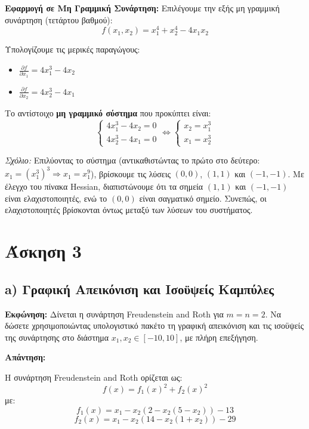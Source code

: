 \documentclass[a4paper,12pt]{article}
\begin{document}
\textbf{Εφαρμογή σε Μη Γραμμική Συνάρτηση:}
Επιλέγουμε την εξής μη γραμμική συνάρτηση (τετάρτου βαθμού):
\begin{equation}
    f(x_1, x_2) = x_1^4 + x_2^4 - 4x_1 x_2
\end{equation}

Υπολογίζουμε τις μερικές παραγώγους:
\begin{itemize}
    \item $\frac{\partial f}{\partial x_1} = 4x_1^3 - 4x_2$
    \item $\frac{\partial f}{\partial x_2} = 4x_2^3 - 4x_1$
\end{itemize}

Το αντίστοιχο \textbf{μη γραμμικό σύστημα} που προκύπτει είναι:
\begin{equation}
    \begin{cases}
        4x_1^3 - 4x_2 = 0 \\
        4x_2^3 - 4x_1 = 0
    \end{cases}
    \iff
    \begin{cases}
        x_2 = x_1^3 \\
        x_1 = x_2^3
    \end{cases}
\end{equation}

\textit{Σχόλιο:} Επιλύοντας το σύστημα (αντικαθιστώντας το πρώτο στο δεύτερο: $x_1 = (x_1^3)^3 \Rightarrow x_1 = x_1^9$), βρίσκουμε τις λύσεις $(0,0)$, $(1,1)$ και $(-1,-1)$. Με έλεγχο του πίνακα Hessian, διαπιστώνουμε ότι τα σημεία $(1,1)$ και $(-1,-1)$ είναι ελαχιστοποιητές, ενώ το $(0,0)$ είναι σαγματικό σημείο. Συνεπώς, οι ελαχιστοποιητές βρίσκονται όντως μεταξύ των λύσεων του συστήματος.

\section*{Άσκηση 3}

\subsection*{a) Γραφική Απεικόνιση και Ισοϋψείς Καμπύλες}

\textbf{Εκφώνηση:}
Δίνεται η συνάρτηση Freudenstein and Roth για $m=n=2$. Να δώσετε χρησιμοποιώντας υπολογιστικό πακέτο τη γραφική απεικόνιση και τις ισοϋψείς της συνάρτησης στο διάστημα $x_1, x_2 \in [-10, 10]$, με πλήρη επεξήγηση.

\textbf{Απάντηση:}

Η συνάρτηση Freudenstein and Roth ορίζεται ως:
$$ f(x) = f_1(x)^2 + f_2(x)^2 $$
με:
$$ f_1(x) = x_1 - x_2(2 - x_2(5 - x_2)) - 13 $$
$$ f_2(x) = x_1 - x_2(14 - x_2(1 + x_2)) - 29 $$
\end{document}
